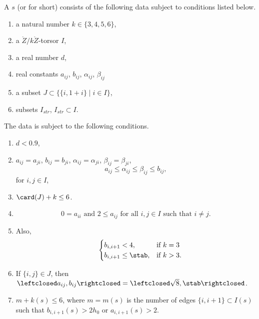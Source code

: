 \begin{definition}
%
A  $s$ (or  for short)
consists of the following data subject
to conditions listed below.
\begin{enumerate}
\item a natural number $k\in \{3,4,5,6\}$,
\item a $\ring{Z}/k\ring{Z}$-torsor $I$,
\item a real number $d$,
\item real constants $a_{ij}$, $b_{ij}$, $\alpha_{ij}$, $\beta_{ij}$ 
\item a subset $J\subset \{ \{i,1+i\} \mid i\in I\}$, 
\item subsets $I_{str}$, $I_{str} \subset I$.
\end{enumerate}
The data is subject to the following conditions.
\begin{enumerate}
\item $d < 0.9$,
\item 
   $a_{ij} = a_{ji}$, $b_{ij}=b_{ji}$, $\alpha_{ij}=\alpha_{ji}$,
$\beta_{ij}= \beta_{ji}$,  
\[
a_{ij}\le \alpha_{ij}\le \beta_{ij}\le b_{ij},
\]
 for $i,j\in I$,
\item  $\card(J)+k\le 6$.
\item 
\[
0 = a_{ii}\text{ and } 2\le a_{ij} \text{ for all }  i,j\in I \text{ such that } i\ne j.
\]  
\item
  Also, 
\[
   ~\quad \begin{cases}
    b_{i,i+1} < 4, & \text{if } k = 3\\
    b_{i,i+1}\le \stab, & \text{if } k > 3.
    \end{cases}
\]  
\item
If $\{i,j\}\in J$, then $\leftclosed
  a_{ij},b_{ij}\rightclosed=\leftclosed\sqrt{8},\stab\rightclosed$.
\item  $m+k(s)\le 6$, where 
$m=m(s)$ is the number of edges $\{i,i+1\}\subset I(s)$ such that
$b_{i ,i+1}(s)> 2h_0$ or $a_{i ,i+1}(s)>2$. 
\end{enumerate}
%
%
\end{definition}

